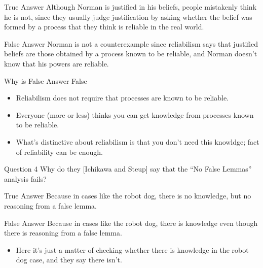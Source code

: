 \documentclass[
  17pt,
  letterpaper,
  ignorenonframetext,
  aspectratio=169,
]{beamer}
\providecommand{\tightlist}{%
  \setlength{\itemsep}{0pt}\setlength{\parskip}{0pt}}\usepackage{longtable,booktabs,array}
\begin{document}
\begin{frame}{True Answer}
\protect\hypertarget{true-answer-1}{}
Although Norman is justified in his beliefs, people mistakenly think he
is not, since they usually judge justification by asking whether the
belief was formed by a process that they think is reliable in the real
world.
\end{frame}

\begin{frame}{False Answer}
\protect\hypertarget{false-answer-1}{}
Norman is not a counterexample since reliabilism says that justified
beliefs are those obtained by a process known to be reliable, and Norman
doesn't know that his powers are reliable.
\end{frame}

\begin{frame}{Why is False Answer False}
\protect\hypertarget{why-is-false-answer-false-1}{}
\begin{itemize}[<+->]
\tightlist
\item
  Reliabilism does not require that processes are known to be reliable.
\item
  Everyone (more or less) thinks you can get knowledge from processes
  known to be reliable.
\item
  What's distinctive about reliabilism is that you don't need this
  knowldge; fact of reliability can be enough.
\end{itemize}
\end{frame}

\begin{frame}{Question 4}
\protect\hypertarget{question-4}{}
Why do they {[}Ichikawa and Steup{]} say that the ``No False Lemmas''
analysis fails?
\end{frame}

\begin{frame}{True Answer}
\protect\hypertarget{true-answer-2}{}
Because in cases like the robot dog, there is no knowledge, but no
reasoning from a false lemma.
\end{frame}

\begin{frame}{False Answer}
\protect\hypertarget{false-answer-2}{}
Because in cases like the robot dog, there is knowledge even though
there is reasoning from a false lemma.

\begin{itemize}[<+->]
\tightlist
\item
  Here it's just a matter of checking whether there is knowledge in the
  robot dog case, and they say there isn't.
\end{itemize}
\end{frame}
\end{document}
